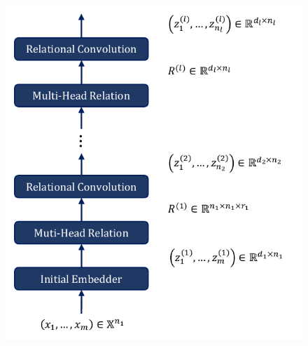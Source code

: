 

\begin{figure}[!ht]
    \centering
    \includegraphics{figs/relconv_architecture.pdf}
    \caption{}\label{fig:relconv_architecture}
\end{figure}